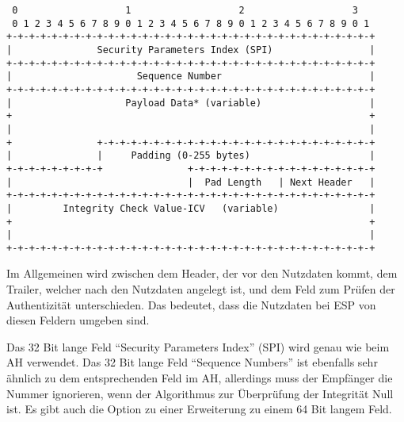 \documentclass[12pt]{scrartcl}
\begin{document}
\begin{addmargin}[-1em]{0em}
\begin{verbatim}
 0                   1                   2                   3
 0 1 2 3 4 5 6 7 8 9 0 1 2 3 4 5 6 7 8 9 0 1 2 3 4 5 6 7 8 9 0 1
+-+-+-+-+-+-+-+-+-+-+-+-+-+-+-+-+-+-+-+-+-+-+-+-+-+-+-+-+-+-+-+-+ 
|               Security Parameters Index (SPI)                 | 
+-+-+-+-+-+-+-+-+-+-+-+-+-+-+-+-+-+-+-+-+-+-+-+-+-+-+-+-+-+-+-+-+ 
|                      Sequence Number                          | 
+-+-+-+-+-+-+-+-+-+-+-+-+-+-+-+-+-+-+-+-+-+-+-+-+-+-+-+-+-+-+-+-+ 
|                    Payload Data* (variable)                   | 
+                                                               + 
|                                                               | 
+               +-+-+-+-+-+-+-+-+-+-+-+-+-+-+-+-+-+-+-+-+-+-+-+-+
|               |     Padding (0-255 bytes)                     |
+-+-+-+-+-+-+-+-+               +-+-+-+-+-+-+-+-+-+-+-+-+-+-+-+-+
|                               |  Pad Length   | Next Header   |
+-+-+-+-+-+-+-+-+-+-+-+-+-+-+-+-+-+-+-+-+-+-+-+-+-+-+-+-+-+-+-+-+
|         Integrity Check Value-ICV   (variable)                |
+                                                               +
|                                                               |
+-+-+-+-+-+-+-+-+-+-+-+-+-+-+-+-+-+-+-+-+-+-+-+-+-+-+-+-+-+-+-+-+
\end{verbatim}
\end{addmargin}
Im Allgemeinen wird zwischen dem Header, der vor den Nutzdaten kommt, dem Trailer, welcher nach den Nutzdaten angelegt ist, und dem Feld zum Prüfen der Authentizität unterschieden. Das bedeutet, dass die Nutzdaten bei ESP von diesen Feldern umgeben sind.

Das 32 Bit lange Feld "`Security Parameters Index"' (SPI) wird genau wie beim AH verwendet. Das 32 Bit lange Feld "`Sequence Numbers"' ist ebenfalls sehr ähnlich zu dem entsprechenden Feld im AH, allerdings muss der Empfänger die Nummer ignorieren, wenn der Algorithmus zur Überprüfung der Integrität Null ist. Es gibt auch die Option zu einer Erweiterung zu einem 64 Bit langem Feld.
\end{document}

